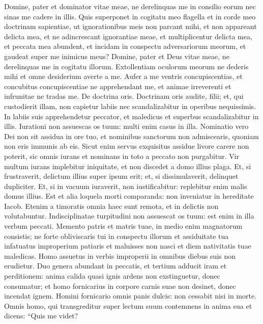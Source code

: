 \begin{biblechapter}  
\verse Domine, pater et dominator vitae meae, ne derelinquas me in consilio eorum nec sinas me cadere in illis. 
\verse Quis superponet in cogitatu meo flagella et in corde meo doctrinam sapientiae, ut ignorationibus meis non parcant mihi, et non appareant delicta mea, 
\verse et ne adincrescant ignorantiae meae, et multiplicentur delicta mea, et peccata mea abundent, et incidam in conspectu adversariorum meorum, et gaudeat super me inimicus meus? 
\verse Domine, pater et Deus vitae meae, ne derelinquas me in cogitatu illorum. 
\verse Extollentiam oculorum meorum ne dederis mihi et omne desiderium averte a me. 
\verse Aufer a me ventris concupiscentias, et concubitus concupiscentiae ne apprehendant me, et animae irreverenti et infrunitae ne tradas me. 
\verse De doctrina oris. Doctrinam oris audite, filii; et, qui custodierit illam, non capietur labiis nec scandalizabitur in operibus nequissimis. 
\verse In labiis suis apprehendetur peccator, et maledicus et superbus scandalizabitur in illis. 
\verse Iurationi non assuescas os tuum: multi enim casus in illa. 
\verse Nominatio vero Dei non sit assidua in ore tuo, et nominibus sanctorum non admiscearis, quoniam non eris immunis ab eis. 
\verse Sicut enim servus exquisitus assidue livore carere non poterit, sic omnis iurans et nominans in toto a peccato non purgabitur. 
\verse Vir multum iurans implebitur iniquitate, et non discedet a domo illius plaga. 
\verse Et, si frustraverit, delictum illius super ipsum erit; et, si dissimulaverit, delinquet dupliciter. 
\verse Et, si in vacuum iuraverit, non iustificabitur: replebitur enim malis domus illius. 
\verse Est et alia loquela morti comparanda: non inveniatur in hereditate Iacob. 
\verse Etenim a timoratis omnia haec sunt remota, et in delictis non volutabuntur. 
\verse Indisciplinatae turpitudini non assuescat os tuum: est enim in illa verbum peccati. 
\verse Memento patris et matris tuae, in medio enim magnatorum consistis; 
\verse ne forte obliviscaris tui in conspectu illorum et assiduitate tua infatuatus improperium patiaris et maluisses non nasci et diem nativitatis tuae maledicas. 
\verse Homo assuetus in verbis improperii in omnibus diebus suis non erudietur. 
\verse Duo genera abundant in peccatis, et tertium adducit iram et perditionem: 
\verse anima calida quasi ignis ardens non exstinguetur, donec consumatur; 
\verse et homo fornicarius in corpore carnis suae non desinet, donec incendat ignem. 
\verse Homini fornicario omnis panis dulcis: non cessabit nisi in morte. 
\verse Omnis homo, qui transgreditur super lectum suum contemnens in anima sua et dicens: “Quis me videt? 

\end{biblechapter}
